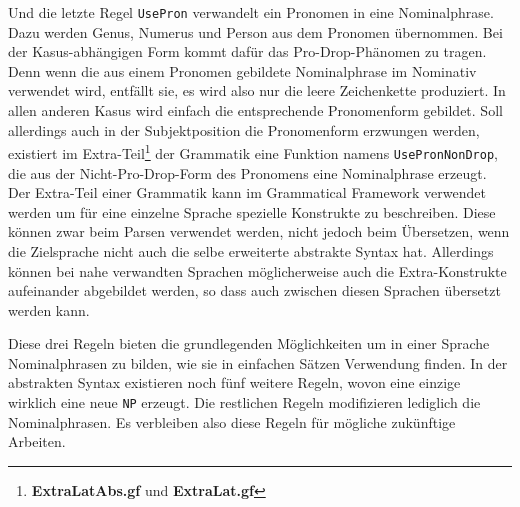Und die letzte Regel \texttt{UsePron} verwandelt ein Pronomen in eine Nominalphrase. Dazu werden Genus, Numerus und Person aus dem Pronomen übernommen. Bei der Kasus-abhängigen Form kommt dafür das Pro-Drop-Phänomen zu tragen. Denn wenn die aus einem Pronomen gebildete Nominalphrase im Nominativ verwendet wird, entfällt sie, es wird also nur die leere Zeichenkette produziert. In allen anderen Kasus wird einfach die entsprechende Pronomenform gebildet. 
Soll allerdings auch in der Subjektposition die Pronomenform erzwungen werden, existiert im Extra-Teil\footnote{\textbf{ExtraLatAbs.gf} und \textbf{ExtraLat.gf}} der Grammatik eine Funktion namens \texttt{UsePronNonDrop}, die aus der Nicht-Pro-Drop-Form des Pronomens eine Nominalphrase erzeugt. Der Extra-Teil einer Grammatik kann im Grammatical Framework verwendet werden um für eine einzelne Sprache spezielle Konstrukte zu beschreiben. Diese können zwar beim Parsen verwendet werden, nicht jedoch beim Übersetzen, wenn die Zielsprache nicht auch die selbe erweiterte abstrakte Syntax hat. Allerdings können bei nahe verwandten Sprachen möglicherweise auch die Extra-Konstrukte aufeinander abgebildet werden, so dass auch zwischen diesen Sprachen übersetzt werden kann.\par
Diese drei Regeln bieten die grundlegenden Möglichkeiten um in einer Sprache Nominalphrasen zu bilden, wie sie in einfachen Sätzen Verwendung finden. In der abstrakten Syntax existieren noch fünf weitere Regeln, wovon eine einzige wirklich eine neue \texttt{NP} erzeugt. Die restlichen Regeln modifizieren lediglich die Nominalphrasen. Es verbleiben also diese Regeln für mögliche zukünftige Arbeiten.
